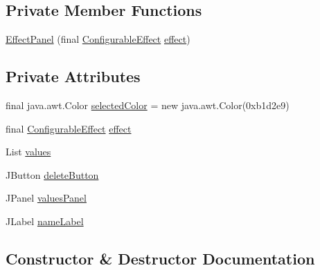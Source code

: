 \subsection*{Private Member Functions}
\begin{DoxyCompactItemize}
\item 
\mbox{\hyperlink{classorg_1_1newdawn_1_1slick_1_1tools_1_1hiero_1_1_hiero_1_1_effect_panel_a63dc8aab0304f670f9425430b8add78e}{Effect\+Panel}} (final \mbox{\hyperlink{interfaceorg_1_1newdawn_1_1slick_1_1font_1_1effects_1_1_configurable_effect}{Configurable\+Effect}} \mbox{\hyperlink{classorg_1_1newdawn_1_1slick_1_1tools_1_1hiero_1_1_hiero_1_1_effect_panel_a57287dac230d74e637ffe17f55736869}{effect}})
\end{DoxyCompactItemize}
\subsection*{Private Attributes}
\begin{DoxyCompactItemize}
\item 
final java.\+awt.\+Color \mbox{\hyperlink{classorg_1_1newdawn_1_1slick_1_1tools_1_1hiero_1_1_hiero_1_1_effect_panel_a1027c75c43844b95f5d3341bc7bb4286}{selected\+Color}} = new java.\+awt.\+Color(0xb1d2e9)
\item 
final \mbox{\hyperlink{interfaceorg_1_1newdawn_1_1slick_1_1font_1_1effects_1_1_configurable_effect}{Configurable\+Effect}} \mbox{\hyperlink{classorg_1_1newdawn_1_1slick_1_1tools_1_1hiero_1_1_hiero_1_1_effect_panel_a57287dac230d74e637ffe17f55736869}{effect}}
\item 
List \mbox{\hyperlink{classorg_1_1newdawn_1_1slick_1_1tools_1_1hiero_1_1_hiero_1_1_effect_panel_a9dc442992f06a08442cc7e8430615534}{values}}
\item 
J\+Button \mbox{\hyperlink{classorg_1_1newdawn_1_1slick_1_1tools_1_1hiero_1_1_hiero_1_1_effect_panel_af714c92441bfd930e38dfad0ea00457a}{delete\+Button}}
\item 
J\+Panel \mbox{\hyperlink{classorg_1_1newdawn_1_1slick_1_1tools_1_1hiero_1_1_hiero_1_1_effect_panel_af5143573310e9ad4c1d3ff511d8967de}{values\+Panel}}
\item 
J\+Label \mbox{\hyperlink{classorg_1_1newdawn_1_1slick_1_1tools_1_1hiero_1_1_hiero_1_1_effect_panel_ab7a1975493a3fa12a1636af0bdbd697a}{name\+Label}}
\end{DoxyCompactItemize}


\subsection{Constructor \& Destructor Documentation}
\mbox{\label{classorg_1_1newdawn_1_1slick_1_1tools_1_1hiero_1_1_hiero_1_1_effect_panel_a63dc8aab0304f670f9425430b8add78e}} 
